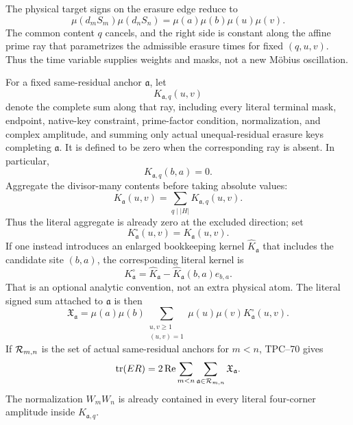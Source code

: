 The physical target signs on the erasure edge reduce to
\begin{equation}
 \mu(d_mS_m)\mu(d_nS_n)
 =
 \mu(a)\mu(b)\mu(u)\mu(v).
\label{eq:frozen-primitive-sign}
\end{equation}
The common content \(q\) cancels, and the right side is constant along the
affine prime ray that parametrizes the admissible erasure times for fixed
\((q,u,v)\).  Thus the time variable supplies weights and masks, not a new
M\"obius oscillation.

For a fixed same-residual anchor \(\mathfrak a\), let
\[
 K_{\mathfrak a,q}(u,v)
\]
denote the complete sum along that ray, including every literal terminal
mask, endpoint, native-key constraint, prime-factor condition, normalization,
and complex amplitude, and summing only actual unequal-residual erasure
keys completing \(\mathfrak a\).  It is defined to be zero when the
corresponding ray is absent.  In particular,
\[
 K_{\mathfrak a,q}(b,a)=0.
\]
Aggregate the divisor-many contents before taking absolute values:
\begin{equation}
 K_{\mathfrak a}(u,v)
 =
 \sum_{q\mid |H|}K_{\mathfrak a,q}(u,v).
\label{eq:aggregate-q-kernel}
\end{equation}
Thus the literal aggregate is already zero at the excluded direction; set
\begin{equation}
 K^\circ_{\mathfrak a}(u,v)
 =
 K_{\mathfrak a}(u,v).
\label{eq:anchor-removed-kernel}
\end{equation}
If one instead introduces an enlarged bookkeeping kernel
\(\widehat K_{\mathfrak a}\) that includes the candidate site \((b,a)\),
the corresponding literal kernel is
\[
 K^\circ_{\mathfrak a}
 =
 \widehat K_{\mathfrak a}
 -
 \widehat K_{\mathfrak a}(b,a)e_{b,a}.
\]
That is an optional analytic convention, not an extra physical atom.
The literal signed sum attached to \(\mathfrak a\) is then
\begin{equation}
 \boxed{
 \mathfrak X_{\mathfrak a}
 =
 \mu(a)\mu(b)
 \sum_{\substack{u,v\ge1\\(u,v)=1}}
 \mu(u)\mu(v)K^\circ_{\mathfrak a}(u,v).}
\label{eq:physical-plane-coefficient}
\end{equation}
If \(\mathcal R_{m,n}\) is the set of actual same-residual anchors for
\(m<n\), TPC--70 gives
\begin{equation}
 \operatorname{tr}(ER)
 =
 2\operatorname{Re}
 \sum_{m<n}\sum_{\mathfrak a\in\mathcal R_{m,n}}
 \mathfrak X_{\mathfrak a}.
\label{eq:trace-by-primitive-anchors}
\end{equation}
The normalization \(W_mW_n\) is already contained in every literal
four-corner amplitude inside \(K_{\mathfrak a,q}\).

